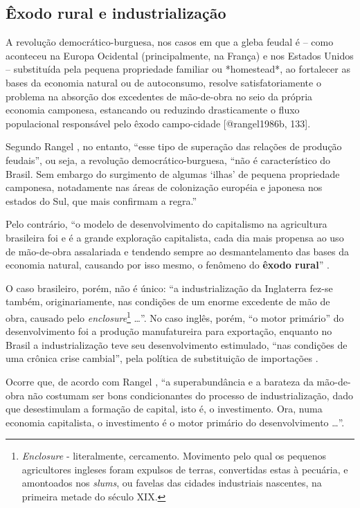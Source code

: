 \documentclass[
	12pt,				%
	oneside,			%
	a4paper,			%
	chapter=TITLE,		%
	section=TITLE,		%
	english,			%
	brazil				%
	]{abntex2}
\begin{document}
\hypertarget{uxeaxodo-rural-e-industrializauxe7uxe3o}{%
\subsection{Êxodo rural e industrialização}\label{uxeaxodo-rural-e-industrializauxe7uxe3o}}
\begin{citacao}
A revolução democrático-burguesa, nos casos em que a gleba feudal é -- como
aconteceu na Europa Ocidental (principalmente, na França) e nos Estados Unidos
-- substituída pela pequena propriedade familiar ou *homestead*, ao fortalecer
as bases da economia natural ou de autoconsumo, resolve satisfatoriamente o
problema na absorção dos excedentes de mão-de-obra no seio da própria economia
camponesa, estancando ou reduzindo drasticamente o fluxo populacional
responsável pelo êxodo campo-cidade [@rangel1986b, 133]. 
\end{citacao}
Segundo Rangel \autocite*[133]{rangel1986b}, no entanto, ``esse tipo de superação das
relações de produção feudais'', ou seja, a revolução democrático-burguesa, ``não é
característico do Brasil. Sem embargo do surgimento de algumas `ilhas' de
pequena propriedade camponesa, notadamente nas áreas de colonização européia e
japonesa nos estados do Sul, que mais confirmam a regra.''

Pelo contrário, ``o modelo de desenvolvimento do capitalismo na agricultura
brasileira foi e é a grande exploração capitalista, cada dia mais propensa ao
uso de mão-de-obra assalariada e tendendo sempre ao desmantelamento das bases da
economia natural, causando por isso mesmo, o fenômeno do \textbf{êxodo rural}''
\autocite[134, grifo nosso]{rangel1986b}.

O caso brasileiro, porém, não é único: ``a industrialização da Inglaterra fez-se
também, originariamente, nas condições de um enorme excedente de mão de obra,
causado pelo \emph{enclosure}\footnote{\emph{Enclosure} - literalmente, cercamento. Movimento pelo qual os pequenos
  agricultores ingleses foram expulsos de terras, convertidas estas à pecuária, e
  amontoados nos \emph{slums}, ou favelas das cidades industriais nascentes, na
  primeira metade do século XIX.} \ldots{}''. No caso inglês, porém, ``o motor primário'' do
desenvolvimento foi a produção manufatureira para exportação, enquanto no Brasil
a industrialização teve seu desenvolvimento estimulado, ``nas condições de uma
crônica crise cambial'', pela política de substituição de importações
\autocite[43-44]{rangel1962}.

Ocorre que, de acordo com Rangel \autocite*[134]{rangel1986b}, ``a superabundância e a
barateza da mão-de-obra não costumam ser bons condicionantes do processo de
industrialização, dado que desestimulam a formação de capital, isto é, o
investimento. Ora, numa economia capitalista, o investimento é o motor primário
do desenvolvimento \ldots{}''.
\end{document}
